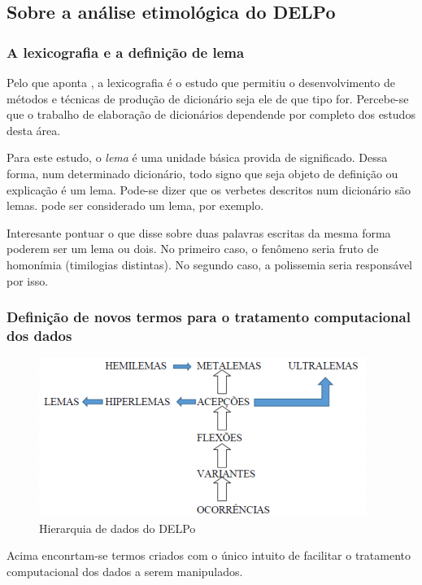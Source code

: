 \subsection{Sobre a análise etimológica do DELPo}
\label{subsec:analise-etimologica}

\subsubsection{A lexicografia e a definição de lema}
\label{subsubsec:lexicografia-lema}

Pelo que aponta \citep[p.~20]{Bar:14}, a lexicografia é o estudo que permitiu o
desenvolvimento de métodos e técnicas de produção de dicionário seja ele de que
tipo for. Percebe-se que o trabalho de elaboração de dicionários dependende por
completo dos estudos desta área.

Para este estudo, o \emph{lema} é uma unidade básica provida de significado.
Dessa forma, num determinado dicionário, todo signo que seja objeto de definição
ou explicação é um lema. Pode-se dizer que os verbetes descritos num dicionário
são lemas.  pode ser considerado um lema, por exemplo.

Interesante pontuar o que disse \citet[p.~146]{Mar:17} sobre duas palavras escritas
da mesma forma poderem ser um lema ou dois. No primeiro caso, o fenômeno seria
fruto de homonímia (timilogias distintas). No segundo caso, a polissemia seria
responsável por isso.

\subsubsection{Definição de novos termos para o tratamento computacional dos
dados}\label{subsubsec:tratamento-computacional-dos-dados}

\begin{figure}[ht]
    \centering
    \includegraphics[width=.5\textwidth]{figuras/dado_hierarquia_delpo.png}
    \caption{Hierarquia de dados do DELPo}
    \label{fig:dados-hierarquia}
\end{figure}

Acima enconrtam-se termos criados com o único intuito de facilitar o tratamento
computacional dos dados a serem manipulados.

